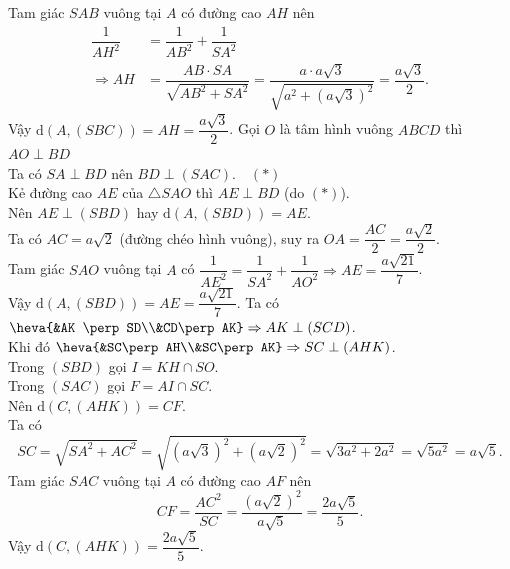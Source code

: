 \begin{ex}
{\begin{itemchoice}
		Tam giác  $SAB$ vuông tại $A$ có đường cao $AH$ nên
		\begin{align*}
			\dfrac{1}{AH^2}&=\dfrac{1}{AB^2}+\dfrac{1}{SA^2}\\ 
			\Rightarrow AH&=\dfrac{AB \cdot SA}{\sqrt{AB^2+SA^2}}=\dfrac{a \cdot a\sqrt{3}}{\sqrt{a^2+(a\sqrt{3})^2}}=\dfrac{a\sqrt{3}}{2}. 
		\end{align*}
		 Vậy $\mathrm{d}\left(A,(SBC)\right)=AH=\dfrac{a\sqrt{3}}{2}$.
		\itemch Gọi $O$  là tâm hình vuông $ABCD$ thì $AO \perp BD$\\
		Ta có $SA \perp BD$ nên $BD \perp  (SAC). \quad(*)$\\
		Kẻ đường cao $AE$ của $\triangle SAO$ thì  $AE \perp BD$ (do $(*)$).\\
		Nên  $AE \perp (SBD)$ hay $\mathrm{d}\left(A,(SBD)\right)=AE$.\\
		Ta có $AC=a\sqrt{2}$ (đường chéo hình  vuông), suy ra $OA=\dfrac{AC}{2}=\dfrac{a\sqrt{2}}{2}$.\\
		Tam giác $SAO$ vuông tại $A$ có $\dfrac{1}{AE^2}=\dfrac{1}{SA^2}+\dfrac{1}{AO^2}\Rightarrow AE=\dfrac{a\sqrt{21}}{7}$.\\ 
		 Vậy $\mathrm{d}\left(A,(SBD)\right)=AE=\dfrac{a\sqrt{21}}{7}$.
		\itemch Ta có $\heva{&AK \perp  SD\\&CD\perp AK}\Rightarrow AK\perp(SCD)$.\\
		Khi đó $\heva{&SC\perp AH\\&SC\perp AK}\Rightarrow  SC\perp (AHK)$.\\
		Trong $(SBD)$ gọi $I=KH\cap SO$.\\ 
		Trong $(SAC)$ gọi $F=AI\cap  SC$.\\
		Nên $\mathrm{d}\left(C,  (AHK)\right)=CF$.\\
		Ta có 
		\[SC=\sqrt{SA^2+AC^2}=\sqrt{\left(a\sqrt{3}\right)^2+\left(a\sqrt{2}\right)^2}=\sqrt{3a^2+2a^2}=\sqrt{5a^2}=a\sqrt{5}.\] 
		Tam giác  $SAC$ vuông tại $A$ có đường cao $AF$ nên
		\[CF=\dfrac{AC^2}{SC}=\dfrac{\left(a\sqrt{2}\right)^2}{a\sqrt{5}}=\dfrac{2a\sqrt{5}}{5}.\] 
		 Vậy $\mathrm{d}\left( C,(AHK)\right)=\dfrac{2a\sqrt{5}}{5}.$
\end{itemchoice}	}
\end{ex}

